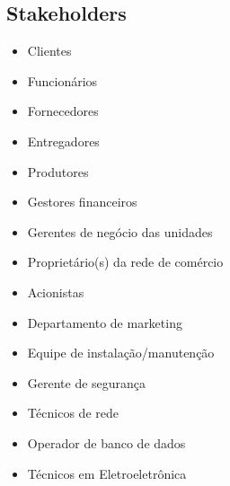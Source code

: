 \subsection{Stakeholders}
\begin{itemize}
	\item Clientes 
	\item Funcionários
	\item Fornecedores
	\item Entregadores
	\item Produtores
	\item Gestores financeiros
	\item Gerentes de negócio das unidades
	\item Proprietário(s) da rede de comércio
	\item Acionistas
	\item Departamento de marketing
	\item Equipe de instalação/manutenção 
	\item Gerente de segurança
	\item Técnicos de rede
	\item Operador de banco de dados
	\item Técnicos em Eletroeletrônica
\end{itemize}

